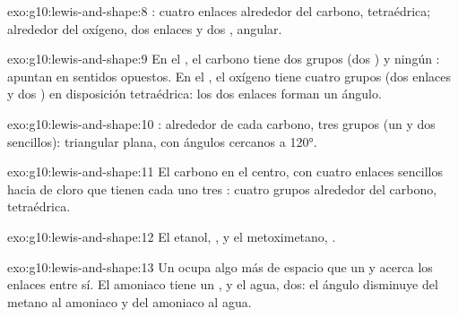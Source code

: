 \begin{solution}{exo:g10:lewis-and-shape:8}
: cuatro enlaces alrededor del
carbono, tetraédrica; alrededor del oxígeno, dos enlaces y dos , angular.
\end{solution}

\begin{solution}{exo:g10:lewis-and-shape:9}
En el , el carbono tiene dos grupos (dos ) y
ningún : apuntan en sentidos opuestos. En el ,
el oxígeno tiene cuatro grupos (dos enlaces y dos )
en disposición tetraédrica: los dos enlaces forman un ángulo.
\end{solution}

\begin{solution}{exo:g10:lewis-and-shape:10}
: alrededor de cada carbono, tres
grupos (un  y dos sencillos): triangular plana, con ángulos
cercanos a \ang{120}.
\end{solution}

\begin{solution}{exo:g10:lewis-and-shape:11}
El carbono en el centro, con cuatro enlaces sencillos hacia  de
cloro que tienen cada uno tres : cuatro grupos
alrededor del carbono, tetraédrica.
\end{solution}

\begin{solution}{exo:g10:lewis-and-shape:12}
El etanol, , y el
metoximetano,
.
\end{solution}

\begin{solution}{exo:g10:lewis-and-shape:13}
Un  ocupa algo más de espacio que un  y
acerca los enlaces entre sí. El amoniaco tiene un , y el
agua, dos: el ángulo disminuye del metano al amoniaco y del amoniaco al
agua.
\end{solution}

